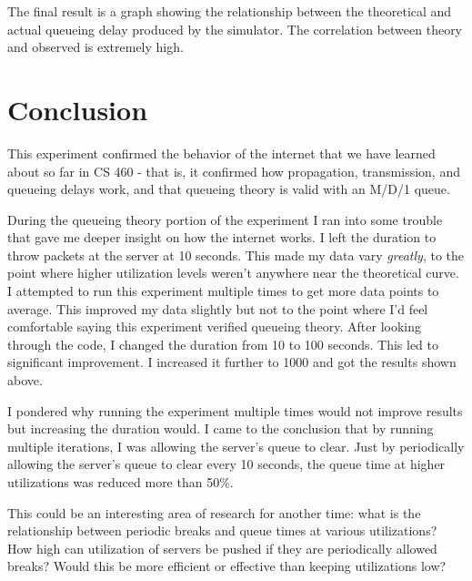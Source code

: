 \documentclass[11pt]{article}
\begin{document}
The final result is a graph showing the relationship between the theoretical and actual queueing delay produced by the simulator. The correlation between theory and observed is extremely high. 

\section{Conclusion}

This experiment confirmed the behavior of the internet that we have learned about so far in CS 460 - that is, it confirmed how propagation, transmission, and queueing delays work, and that queueing theory is valid with an M/D/1 queue.

During the queueing theory portion of the experiment I ran into some trouble that gave me deeper insight on how the internet works. I left the duration to throw packets at the server at 10 seconds. This made my data vary \emph{greatly}, to the point where higher utilization levels weren't anywhere near the theoretical curve. I attempted to run this experiment multiple times to get more data points to average. This improved my data slightly but not to the point where I'd feel comfortable saying this experiment verified queueing theory. After looking through the code, I changed the duration from 10 to 100 seconds. This led to significant improvement. I increased it further to 1000 and got the results shown above. 

I pondered why running the experiment multiple times would not improve results but increasing the duration would. I came to the conclusion that by running multiple iterations, I was allowing the server's queue to clear. Just by periodically allowing the server's queue to clear every 10 seconds, the queue time at higher utilizations was reduced more than 50\%.

This could be an interesting area of research for another time: what is the relationship between periodic breaks and queue times at various utilizations? How high can utilization of servers be pushed if they are periodically allowed breaks? Would this be more efficient or effective than keeping utilizations low?
\end{document}

